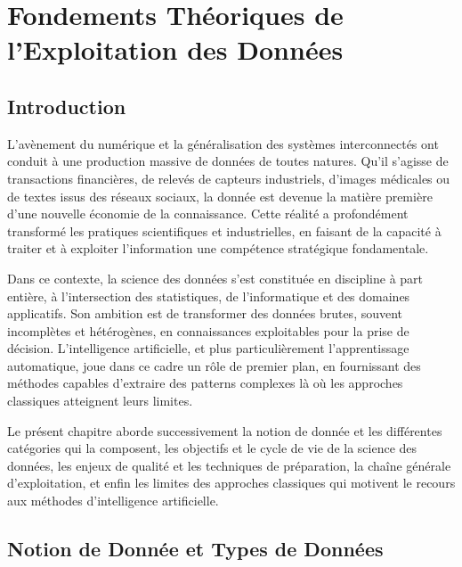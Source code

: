 \chapter{Fondements Théoriques de l'Exploitation des Données}


\section{Introduction}

L'avènement du numérique et la généralisation des systèmes interconnectés ont conduit à une production massive de données de toutes natures. Qu'il s'agisse de transactions financières, de relevés de capteurs industriels, d'images médicales ou de textes issus des réseaux sociaux, la donnée est devenue la matière première d'une nouvelle économie de la connaissance. Cette réalité a profondément transformé les pratiques scientifiques et industrielles, en faisant de la capacité à traiter et à exploiter l'information une compétence stratégique fondamentale.

Dans ce contexte, la science des données s'est constituée en discipline à part entière, à l'intersection des statistiques, de l'informatique et des domaines applicatifs. Son ambition est de transformer des données brutes, souvent incomplètes et hétérogènes, en connaissances exploitables pour la prise de décision. L'intelligence artificielle, et plus particulièrement l'apprentissage automatique, joue dans ce cadre un rôle de premier plan, en fournissant des méthodes capables d'extraire des patterns complexes là où les approches classiques atteignent leurs limites.

Le présent chapitre aborde successivement la notion de donnée et les différentes catégories qui la composent, les objectifs et le cycle de vie de la science des données, les enjeux de qualité et les techniques de préparation, la chaîne générale d'exploitation, et enfin les limites des approches classiques qui motivent le recours aux méthodes d'intelligence artificielle.

\section{Notion de Donnée et Types de Données}

